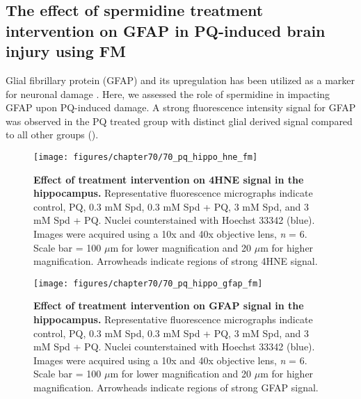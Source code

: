 \subsection{The effect of spermidine treatment intervention on GFAP in PQ-induced brain injury using FM} 
Glial fibrillary protein (GFAP) and its upregulation has been utilized as a marker for neuronal damage \citep{Wu2015}. Here, we assessed the role of spermidine in impacting GFAP upon PQ-induced damage. A strong fluorescence intensity signal for GFAP was observed in the PQ treated group with distinct glial derived signal compared to all other groups ().

\begin{landscape}
\begin{figure}[!htbp]
\center
  \texttt{[image: figures/chapter70/70\_pq\_hippo\_hne\_fm]}
  \caption[Effect of treatment intervention on 4HNE signal in the hippocampus]{\textbf{Effect of treatment intervention on 4HNE signal in the hippocampus.} Representative fluorescence micrographs indicate control, PQ, 0.3 mM Spd, 0.3 mM Spd + PQ, 3 mM Spd, and 3 mM Spd + PQ. Nuclei counterstained with Hoechst 33342 (blue). Images were acquired using a 10x and 40x objective lens, \textit{n} = 6. Scale bar = 100 $\mu$m for lower magnification and 20 $\mu$m for higher magnification. Arrowheads indicate regions of strong 4HNE signal.}
  \label{fig:70_pq_hippo_hne_fm}
\end{figure} 
\end{landscape}

\begin{landscape}
\begin{figure}[!htbp]
\center
  \texttt{[image: figures/chapter70/70\_pq\_hippo\_gfap\_fm]}
  \caption[Effect of treatment intervention on GFAP signal in the hippocampus]{\textbf{Effect of treatment intervention on GFAP signal in the hippocampus.} Representative fluorescence micrographs indicate control, PQ, 0.3 mM Spd, 0.3 mM Spd + PQ, 3 mM Spd, and 3 mM Spd + PQ. Nuclei counterstained with Hoechst 33342 (blue). Images were acquired using a 10x and 40x objective lens, \textit{n} = 6. Scale bar = 100 $\mu$m for lower magnification and 20 $\mu$m for higher magnification. Arrowheads indicate regions of strong GFAP signal.}
  \label{fig:70_pq_hippo_gfap_fm}
\end{figure} 
\end{landscape}


